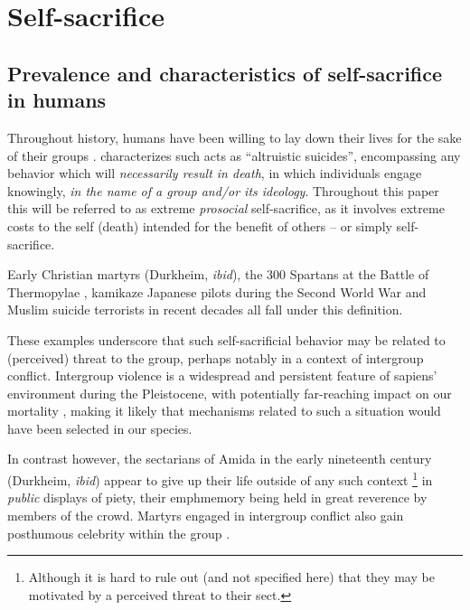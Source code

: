\documentclass[a4paper,12pt]{report}
\begin{document}
\section{Self-sacrifice}
\label{s:intro}
\subsection{Prevalence and characteristics of self-sacrifice in humans}
Throughout history, humans have been willing to lay down their lives for the sake of their groups
\cite{whitehouse_dying_2018}.
 characterizes such acts as 
“altruistic suicides”,
encompassing any behavior which will \emph{necessarily result in death}, in which individuals engage
knowingly, \emph{in the name of a group and/or its ideology}. Throughout this paper this
will be referred to as extreme \emph{prosocial} self-sacrifice, as it involves extreme costs
to the self (death) intended for the benefit of others – or simply self-sacrifice.

Early Christian martyrs (Durkheim, \emph{ibid}), the 300 Spartans at the Battle of Thermopylae
\cite{lazenby_defence_1993}, kamikaze Japanese pilots during the Second World War and Muslim suicide
terrorists in recent decades \cite{pape_dying_2006} all fall under this definition.

These examples underscore that such self-sacrificial behavior may be related to (perceived)
threat to the group, perhaps notably in a context of intergroup conflict.
Intergroup violence is a widespread and persistent feature of sapiens’ environment
during the Pleistocene, with potentially far-reaching impact on our mortality \cite{keeley_war_1997},
making it likely that mechanisms related to such a situation would have been selected
in our species. 

In contrast however, the sectarians of Amida in the early nineteenth century
(Durkheim, \emph{ibid}) appear to give up their life outside of any such context
\footnote{Although it is hard to rule out (and not specified here) that they
may be motivated by a perceived threat to their sect.}
in \emph{public} displays of piety, their emph{memory} being held in great reverence 
by members of the crowd. Martyrs engaged in intergroup conflict 
also gain posthumous celebrity within the group \cite{blackwell_middle-class_2008}.
\end{document}
